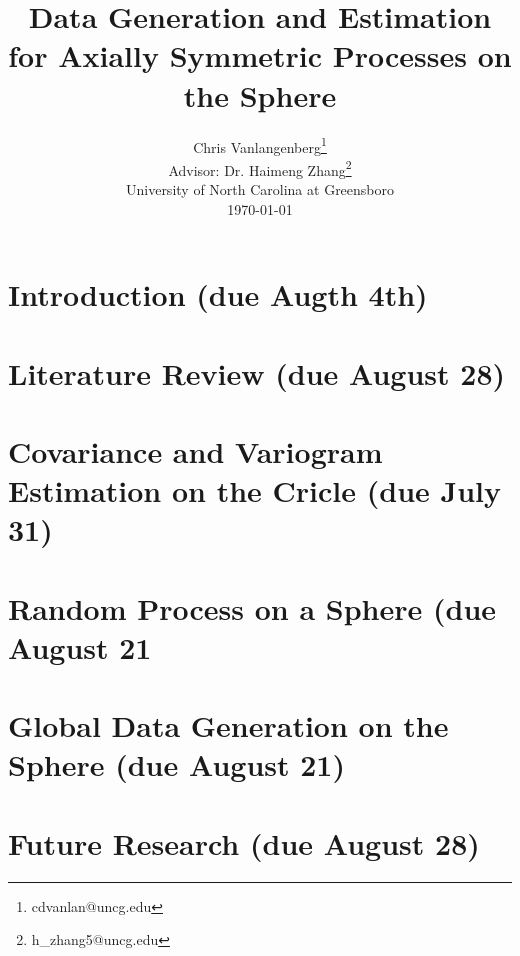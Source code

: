 
\usepackage{graphicx}

\usepackage{Sweave}




\title{{\bf\Large Data Generation and Estimation for Axially Symmetric Processes on the Sphere }}


\author{Chris Vanlangenberg\footnote{cdvanlan@uncg.edu} \\
\bigskip
Advisor: Dr. Haimeng Zhang\footnote{h\_zhang5@uncg.edu}\\ \small{University of North Carolina at Greensboro}\\
\small \today}

\maketitle 
\thispagestyle{empty}



\newpage
\chapter{Introduction (due Augth 4th)}


\chapter{Literature Review (due August 28)}
 


\chapter{Covariance and Variogram Estimation on the Cricle (due July 31)}


\chapter{Random Process on a Sphere (due August 21 }


\chapter{Global Data Generation on the Sphere (due August 21)}


\chapter{Future Research (due August 28)}




